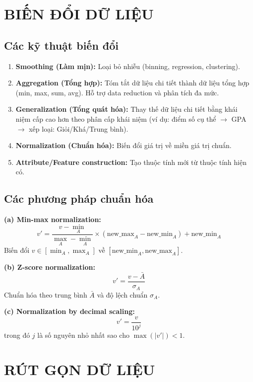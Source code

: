 \documentclass[10pt]{article}
\begin{document}
\section{BIẾN ĐỔI DỮ LIỆU}

\subsection{Các kỹ thuật biến đổi}

\begin{enumerate}
    \item \textbf{Smoothing (Làm mịn):} Loại bỏ nhiễu (binning, regression, clustering).
    \item \textbf{Aggregation (Tổng hợp):} Tóm tắt dữ liệu chi tiết thành dữ liệu tổng hợp (min, max, sum, avg). Hỗ trợ data reduction và phân tích đa mức.
    \item \textbf{Generalization (Tổng quát hóa):} Thay thế dữ liệu chi tiết bằng khái niệm cấp cao hơn theo phân cấp khái niệm (ví dụ: điểm số cụ thể $\to$ GPA $\to$ xếp loại: Giỏi/Khá/Trung bình).
    \item \textbf{Normalization (Chuẩn hóa):} Biến đổi giá trị về miền giá trị chuẩn.
    \item \textbf{Attribute/Feature construction:} Tạo thuộc tính mới từ thuộc tính hiện có.
\end{enumerate}

\subsection{Các phương pháp chuẩn hóa}

\textbf{(a) Min-max normalization:}
\[
v' = \frac{v - \min_A}{\max_A - \min_A} \times (\text{new\_max}_A - \text{new\_min}_A) + \text{new\_min}_A
\]
Biến đổi $v \in [\min_A, \max_A]$ về $[\text{new\_min}_A, \text{new\_max}_A]$.

\textbf{(b) Z-score normalization:}
\[
v' = \frac{v - \bar{A}}{\sigma_A}
\]
Chuẩn hóa theo trung bình $\bar{A}$ và độ lệch chuẩn $\sigma_A$.

\textbf{(c) Normalization by decimal scaling:}
\[
v' = \frac{v}{10^j}
\]
trong đó $j$ là số nguyên nhỏ nhất sao cho $\max(|v'|) < 1$.

\section{RÚT GỌN DỮ LIỆU}
\end{document}
